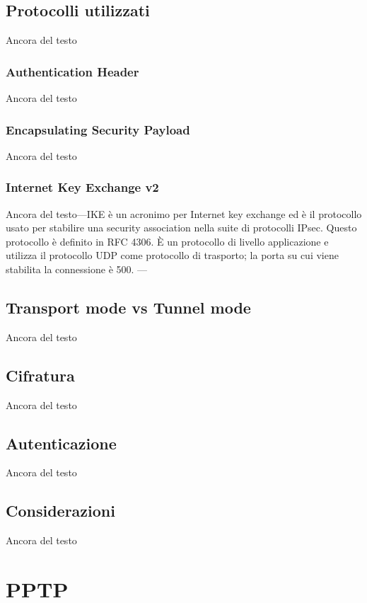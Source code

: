 \subsection{Protocolli utilizzati}
Ancora del testo

\subsubsection{Authentication Header}
Ancora del testo

\subsubsection{Encapsulating Security Payload}
Ancora del testo

\subsubsection{Internet Key Exchange v2}
Ancora del testo---IKE è un acronimo per Internet key exchange ed è il protocollo usato per stabilire una security association nella suite di protocolli IPsec. Questo protocollo è definito in RFC 4306. È un protocollo di livello applicazione e utilizza il protocollo UDP come protocollo di trasporto; la porta su cui viene stabilita la connessione è 500. ---

\subsection{Transport mode vs Tunnel mode}
Ancora del testo

\subsection{Cifratura}
Ancora del testo

\subsection{Autenticazione}
Ancora del testo

\subsection{Considerazioni}
Ancora del testo

\section{PPTP}
